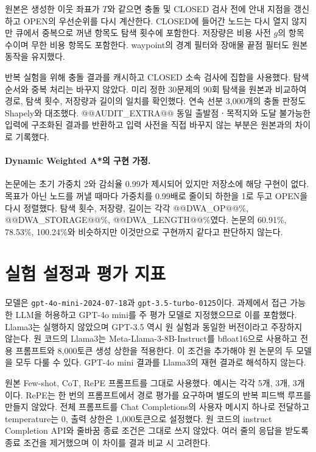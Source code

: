 \documentclass[11pt]{article}
\begin{document}
원본은 생성한 이웃 좌표가 $T$와 같으면 충돌 및 CLOSED 검사 전에 안내 지점을 갱신하고 OPEN의 우선순위를 다시 계산한다. CLOSED에 들어간 노드는 다시 열지 않지만 큐에서 중복으로 꺼낸 항목도 탐색 횟수에 포함한다. 저장량은 비용 사전 $g$의 항목 수이며 무한 비용 항목도 포함한다. waypoint의 경계 필터와 장애물 끝점 필터도 원본 동작을 유지했다.

반복 실험을 위해 충돌 결과를 캐시하고 CLOSED 소속 검사에 집합을 사용했다. 탐색 순서와 중복 처리는 바꾸지 않았다. 미리 정한 30문제의 90회 탐색을 원본과 비교하여 경로, 탐색 횟수, 저장량과 길이의 일치를 확인했다. 연속 선분 3,000개의 충돌 판정도 Shapely와 대조했다. @@AUDIT_EXTRA@@ 동일 출발점ㆍ목적지와 도달 불가능한 입력에 구조화된 결과를 반환하고 입력 사전을 직접 바꾸지 않는 부분은 원본과의 차이로 기록했다.

\paragraph{Dynamic Weighted A*의 구현 가정.}
논문에는 초기 가중치 2와 감쇠율 0.99가 제시되어 있지만 저장소에 해당 구현이 없다. 목표가 아닌 노드를 꺼낼 때마다 가중치를 0.99배로 줄이되 하한을 1로 두고 OPEN을 다시 정렬했다. 탐색 횟수, 저장량, 길이는 각각 @@DWA_OP@@\%, @@DWA_STORAGE@@\%, @@DWA_LENGTH@@\%였다. 논문의 60.91\%, 78.53\%, 100.24\%와 비슷하지만 이것만으로 구현까지 같다고 판단하지 않는다.

\section{실험 설정과 평가 지표}
모델은 \texttt{gpt-4o-mini-2024-07-18}과 \texttt{gpt-3.5-turbo-0125}이다. 과제에서 접근 가능한 LLM을 허용하고 GPT-4o mini를 주 평가 모델로 지정했으므로 이를 포함했다. Llama3는 실행하지 않았으며 GPT-3.5 역시 원 실험과 동일한 버전이라고 주장하지 않는다. 원 코드의 Llama3는 Meta-Llama-3-8B-Instruct를 bfloat16으로 사용하고 전용 프롬프트와 8,000토큰 생성 상한을 적용한다. 이 조건을 추가해야 원 논문의 두 모델을 모두 다룰 수 있다. GPT-4o mini 결과를 Llama3의 재현 결과로 해석하지 않는다.

원본 Few-shot, CoT, RePE 프롬프트를 그대로 사용했다. 예시는 각각 5개, 3개, 3개이다. RePE는 한 번의 프롬프트에서 경로 평가를 요구하며 별도의 반복 피드백 루프를 만들지 않았다. 전체 프롬프트를 Chat Completions의 사용자 메시지 하나로 전달하고 temperature는 0, 출력 상한은 1,000토큰으로 설정했다. 원 코드의 instruct Completion API와 줄바꿈 종료 조건은 그대로 쓰지 않았다. 여러 줄의 응답을 받도록 종료 조건을 제거했으며 이 차이를 결과 비교 시 고려한다.
\end{document}
